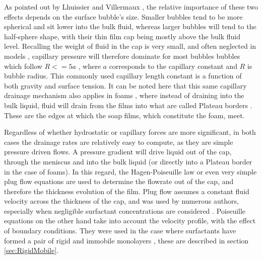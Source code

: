 \documentclass[a4paper,12pt]{article}
\numberwithin{equation}{section}
\numberwithin{figure}{section}
\numberwithin{table}{section}
\begin{document}
As pointed out by Lhuissier and Villermaux \cite{Lhuissier2011}, the relative importance of these two effects depends on the surface bubble's size. Smaller bubbles tend to be more spherical and sit lower into the bulk fluid, whereas larger bubbles will tend to the half-sphere shape, with their thin film cap being mostly above the bulk fluid level. Recalling the weight of fluid in the cap is very small, and often neglected in models \cite{Ida1998}, capillary pressure will therefore dominate for most bubbles bubbles which follow $R <= 5a$ \cite{Lhuissier2011}, where $a$ corresponds to the capillary constant and $R$ is bubble radius. This commonly used capillary length constant is a function of both gravity and surface tension. It can be noted here that this same capillary drainage mechanism also applies in foams \cite{Braun2002}, where instead of draining into the bulk liquid, fluid will drain from the films into what are called Plateau borders \cite{Almgren1976}. These are the edges at which the soap films, which constitute the foam, meet.

Regardless of whether hydrostatic or capillary forces are more significant, in both cases the drainage rates are relatively easy to compute, as they are simple pressure driven flows. A pressure gradient will drive liquid out of the cap, through the meniscus and into the bulk liquid (or directly into a Plateau border in the case of foams). In this regard, the Hagen-Poiseuille law or even very simple plug flow equations are used to determine the flowrate out of the cap, and therefore the thickness evolution of the film. Plug flow assumes a constant fluid velocity across the thickness of the cap, and was used by numerous authors, especially when negligible surfactant concentrations are considered \cite{Debregeas1998, Lhuissier2011, Breward2002, ChampougnyNotBare2016}. Poiseuille equations on the other hand take into account the velocity profile, with the effect of boundary conditions. They were used in the case where surfactants have formed a pair of rigid and immobile monolayers \cite{Nierstrasz1999, Bruinsma1995, Modini2013}, these are described in section \ref{sec:RigidMobile}.
\end{document}
